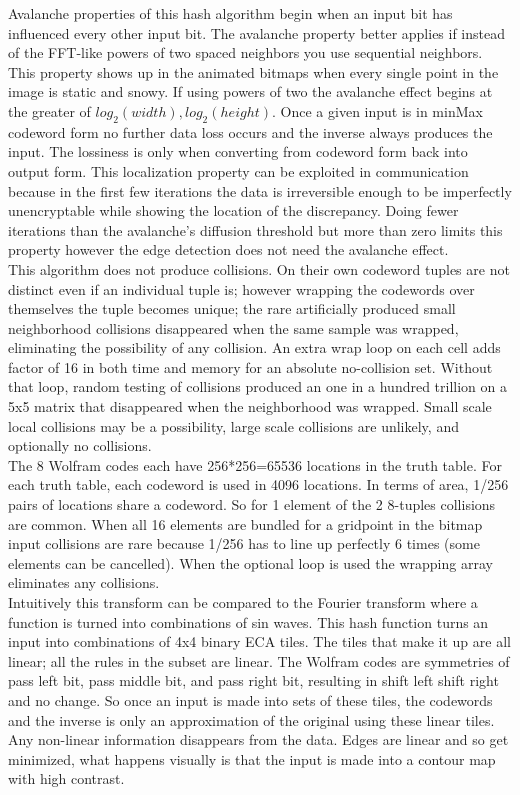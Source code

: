 \documentclass[11pt]{article}
\begin{document}
Avalanche properties of this hash algorithm begin when an input bit has influenced every other input bit. The avalanche property better applies if instead of the FFT-like powers of two spaced neighbors you use sequential neighbors. This property shows up in the animated bitmaps when every single point in the image is static and snowy. If using powers of two the avalanche effect begins at the greater of $log_2 (width) , log_2 (height)$. Once a given input is in minMax codeword form no further data loss occurs and the inverse always produces the input. The lossiness is only when converting from codeword form back into output form.   This localization property can be exploited in communication because in the first few iterations the data is irreversible enough to be imperfectly unencryptable while showing the location of the discrepancy. Doing fewer iterations than the avalanche's diffusion threshold but more than zero limits this property however the edge detection does not need the avalanche effect.\\

This algorithm does not produce collisions. On their own codeword tuples are not distinct even if an individual tuple is; however wrapping the codewords over themselves the tuple becomes unique; the rare artificially produced small neighborhood collisions disappeared when the same sample was wrapped, eliminating the possibility of any collision. An extra wrap loop on each cell adds factor of 16 in both time and memory for an absolute no-collision set. Without that loop, random testing of collisions produced an one in a hundred trillion on a 5x5 matrix that disappeared when the neighborhood was wrapped. Small scale local collisions may be a possibility, large scale collisions are unlikely, and optionally no collisions.\\

The 8 Wolfram codes each have 256*256=65536 locations in the truth table. For each truth table, each codeword is used in 4096 locations. In terms of area, 1/256 pairs of locations share a codeword. So for 1 element of the 2 8-tuples collisions are common. When all 16 elements are bundled for a gridpoint in the bitmap input collisions are rare because 1/256 has to line up perfectly 6 times (some elements can be cancelled). When the optional loop is used the wrapping array eliminates any collisions.\\

Intuitively this transform can be compared to the Fourier transform where a function is turned into combinations of sin waves. This hash function turns an input into combinations of 4x4 binary ECA tiles. The tiles that make it up are all linear; all the rules in the subset are linear. The Wolfram codes are symmetries of pass left bit, pass middle bit, and pass right bit, resulting in shift left shift right and no change.  So once an input is made into sets of these tiles, the codewords and the inverse is only an approximation of the original using these linear tiles. Any non-linear information disappears from the data. Edges are linear and so get minimized, what happens visually is that the input is made into a contour map with high contrast.\\
\end{document}
